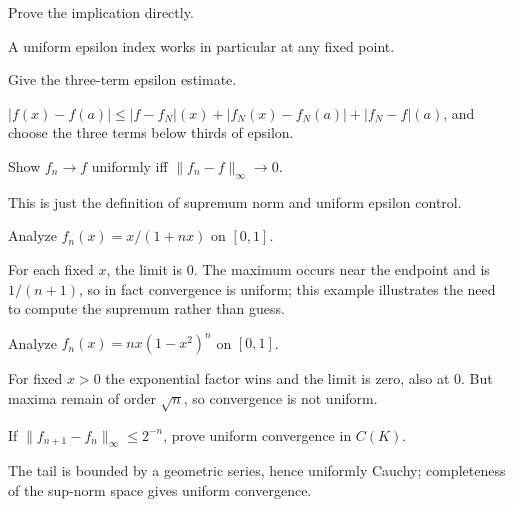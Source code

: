 \begin{problem}\label{prob:ii11-problem-03}
Prove the implication directly.
\end{problem}
\begin{solution}
A uniform epsilon index works in particular at any fixed point.
\end{solution}

\begin{problem}\label{prob:ii11-problem-04}
Give the three-term epsilon estimate.
\end{problem}
\begin{solution}
$|f(x)-f(a)|\le|f-f_N|(x)+|f_N(x)-f_N(a)|+|f_N-f|(a)$, and choose the three terms below thirds of epsilon.
\end{solution}

\begin{problem}\label{prob:ii11-problem-05}
Show $f_n\to f$ uniformly iff $\|f_n-f\|_\infty\to0$.
\end{problem}
\begin{solution}
This is just the definition of supremum norm and uniform epsilon control.
\end{solution}

\begin{problem}\label{prob:ii11-problem-06}
Analyze $f_n(x)=x/(1+nx)$ on $[0,1]$.
\end{problem}
\begin{solution}
For each fixed $x$, the limit is $0$. The maximum occurs near the endpoint and is $1/(n+1)$, so in fact convergence is uniform; this example illustrates the need to compute the supremum rather than guess.
\end{solution}

\begin{problem}\label{prob:ii11-problem-07}
Analyze $f_n(x)=nx(1-x^2)^n$ on $[0,1]$.
\end{problem}
\begin{solution}
For fixed $x>0$ the exponential factor wins and the limit is zero, also at $0$. But maxima remain of order $\sqrt n$, so convergence is not uniform.
\end{solution}

\begin{problem}\label{prob:ii11-problem-08}
If $\|f_{n+1}-f_n\|_\infty\le2^{-n}$, prove uniform convergence in $C(K)$.
\end{problem}
\begin{solution}
The tail is bounded by a geometric series, hence uniformly Cauchy; completeness of the sup-norm space gives uniform convergence.
\end{solution}

